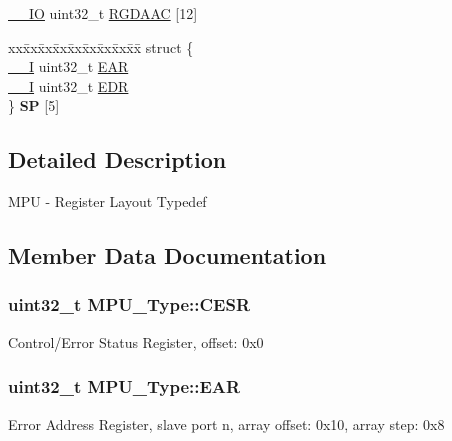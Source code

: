 \begin{DoxyCompactItemize}
\item 
\hyperlink{core__sc300_8h_aec43007d9998a0a0e01faede4133d6be}{\+\_\+\+\_\+\+IO} uint32\+\_\+t \hyperlink{structMPU__Type_aef0fd019f3b3fef54756a7df6cc61cd5}{R\+G\+D\+A\+AC} \mbox{[}12\mbox{]}
\item 
\begin{tabbing}
xx\=xx\=xx\=xx\=xx\=xx\=xx\=xx\=xx\=\kill
struct \{\\
\>\hyperlink{core__sc300_8h_af63697ed9952cc71e1225efe205f6cd3}{\_\_I} uint32\_t \hyperlink{structMPU__Type_a42d8704b2a791eba1d1bc2166e755a77}{EAR}\\
\>\hyperlink{core__sc300_8h_af63697ed9952cc71e1225efe205f6cd3}{\_\_I} uint32\_t \hyperlink{structMPU__Type_a3adbf6d9dac1f29825896fa67d40a4ef}{EDR}\\
\} {\bfseries SP} \mbox{[}5\mbox{]}\hypertarget{structMPU__Type_aaa910093a90686134659fbd32250f41c}{}\label{structMPU__Type_aaa910093a90686134659fbd32250f41c}
\\

\end{tabbing}\end{DoxyCompactItemize}


\subsection{Detailed Description}
M\+PU -\/ Register Layout Typedef 

\subsection{Member Data Documentation}
\subsubsection[{\texorpdfstring{C\+E\+SR}{CESR}}]{ uint32\+\_\+t M\+P\+U\+\_\+\+Type\+::\+C\+E\+SR}\hypertarget{structMPU__Type_a2e4d19626a870bb11f40ff09359fae44}{}\label{structMPU__Type_a2e4d19626a870bb11f40ff09359fae44}
Control/\+Error Status Register, offset\+: 0x0 
\subsubsection[{\texorpdfstring{E\+AR}{EAR}}]{ uint32\+\_\+t M\+P\+U\+\_\+\+Type\+::\+E\+AR}\hypertarget{structMPU__Type_a42d8704b2a791eba1d1bc2166e755a77}{}\label{structMPU__Type_a42d8704b2a791eba1d1bc2166e755a77}
Error Address Register, slave port n, array offset\+: 0x10, array step\+: 0x8 
